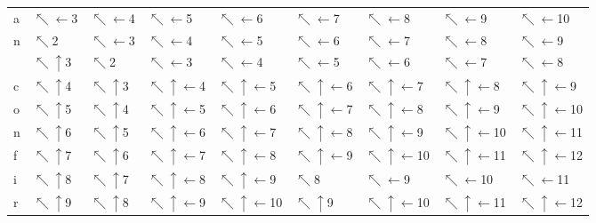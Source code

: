 \begin{tabular}{lllllllll}
a &   $\nwarrow\leftarrow$3 &   $\nwarrow\leftarrow$4 &           $\nwarrow\leftarrow$5 &           $\nwarrow\leftarrow$6 &           $\nwarrow\leftarrow$7 &           $\nwarrow\leftarrow$8 &           $\nwarrow\leftarrow$9 &          $\nwarrow\leftarrow$10 \\
n &             $\nwarrow$2 &   $\nwarrow\leftarrow$3 &           $\nwarrow\leftarrow$4 &           $\nwarrow\leftarrow$5 &           $\nwarrow\leftarrow$6 &           $\nwarrow\leftarrow$7 &           $\nwarrow\leftarrow$8 &           $\nwarrow\leftarrow$9 \\
  &     $\nwarrow\uparrow$3 &             $\nwarrow$2 &           $\nwarrow\leftarrow$3 &           $\nwarrow\leftarrow$4 &           $\nwarrow\leftarrow$5 &           $\nwarrow\leftarrow$6 &           $\nwarrow\leftarrow$7 &           $\nwarrow\leftarrow$8 \\
c &     $\nwarrow\uparrow$4 &     $\nwarrow\uparrow$3 &   $\nwarrow\uparrow\leftarrow$4 &   $\nwarrow\uparrow\leftarrow$5 &   $\nwarrow\uparrow\leftarrow$6 &   $\nwarrow\uparrow\leftarrow$7 &   $\nwarrow\uparrow\leftarrow$8 &   $\nwarrow\uparrow\leftarrow$9 \\
o &     $\nwarrow\uparrow$5 &     $\nwarrow\uparrow$4 &   $\nwarrow\uparrow\leftarrow$5 &   $\nwarrow\uparrow\leftarrow$6 &   $\nwarrow\uparrow\leftarrow$7 &   $\nwarrow\uparrow\leftarrow$8 &   $\nwarrow\uparrow\leftarrow$9 &  $\nwarrow\uparrow\leftarrow$10 \\
n &     $\nwarrow\uparrow$6 &     $\nwarrow\uparrow$5 &   $\nwarrow\uparrow\leftarrow$6 &   $\nwarrow\uparrow\leftarrow$7 &   $\nwarrow\uparrow\leftarrow$8 &   $\nwarrow\uparrow\leftarrow$9 &  $\nwarrow\uparrow\leftarrow$10 &  $\nwarrow\uparrow\leftarrow$11 \\
f &     $\nwarrow\uparrow$7 &     $\nwarrow\uparrow$6 &   $\nwarrow\uparrow\leftarrow$7 &   $\nwarrow\uparrow\leftarrow$8 &   $\nwarrow\uparrow\leftarrow$9 &  $\nwarrow\uparrow\leftarrow$10 &  $\nwarrow\uparrow\leftarrow$11 &  $\nwarrow\uparrow\leftarrow$12 \\
i &     $\nwarrow\uparrow$8 &     $\nwarrow\uparrow$7 &   $\nwarrow\uparrow\leftarrow$8 &   $\nwarrow\uparrow\leftarrow$9 &                     $\nwarrow$8 &           $\nwarrow\leftarrow$9 &          $\nwarrow\leftarrow$10 &          $\nwarrow\leftarrow$11 \\
r &     $\nwarrow\uparrow$9 &     $\nwarrow\uparrow$8 &   $\nwarrow\uparrow\leftarrow$9 &  $\nwarrow\uparrow\leftarrow$10 &             $\nwarrow\uparrow$9 &  $\nwarrow\uparrow\leftarrow$10 &  $\nwarrow\uparrow\leftarrow$11 &  $\nwarrow\uparrow\leftarrow$12 \\

\end{tabular}
